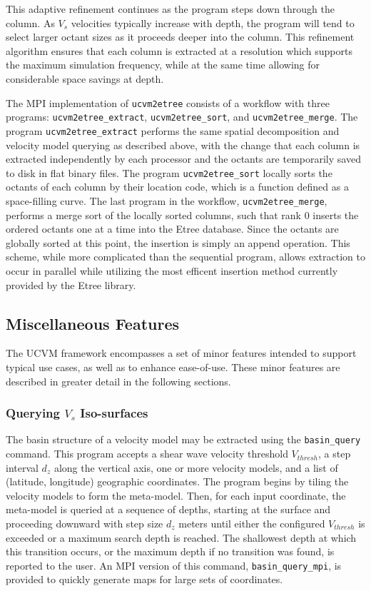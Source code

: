 This adaptive refinement continues as the program steps down through the column. As $V_s$ velocities typically increase with depth, the program will tend to select larger octant sizes as it proceeds deeper into the column. This refinement algorithm ensures that each column is extracted at a resolution which supports the maximum simulation frequency, while at the same time allowing for considerable space savings at depth.

The MPI implementation of \texttt{ucvm2etree} consists of a workflow with three programs: \texttt{ucvm2etree\_extract}, \texttt{ucvm2etree\_sort}, and \texttt{ucvm2etree\_merge}. The program \texttt{ucvm2etree\_extract} performs the same spatial decomposition and velocity model querying as described above, with the change that each column is extracted independently by each processor and the octants are temporarily saved to disk in flat binary files. The program \texttt{ucvm2etree\_sort} locally sorts the octants of each column by their location code, which is a function defined as a space-filling curve. The last program in the workflow, \texttt{ucvm2etree\_merge}, performs a merge sort of the locally sorted columns, such that rank 0 inserts the ordered octants one at a time into the Etree database. Since the octants are globally sorted at this point, the insertion is simply an append operation. This scheme, while more complicated than the sequential program, allows extraction to occur in parallel while utilizing the most efficent insertion method currently provided by the Etree library.

\subsection{Miscellaneous Features}

The UCVM framework encompasses a set of minor features intended to support typical use cases, as well as to enhance ease-of-use. These minor features are described in greater detail in the following sections.

\subsubsection{Querying $V_s$ Iso-surfaces}

The basin structure of a velocity model may be extracted using the \texttt{basin\_query} command. This program accepts a shear wave velocity threshold $V_{thresh}$, a step interval $d_z$ along the vertical axis, one or more velocity models, and a list of (latitude, longitude) geographic coordinates. The program begins by tiling the velocity models to form the meta-model. Then, for each input coordinate, the meta-model is queried at a sequence of depths, starting at the surface and proceeding downward with step size $d_z$ meters until either the configured $V_{thresh}$ is exceeded or a maximum search depth is reached. The shallowest depth at which this transition occurs, or the maximum depth if no transition was found, is reported to the user. An MPI version of this command, \texttt{basin\_query\_mpi}, is provided to quickly generate maps for large sets of coordinates.

